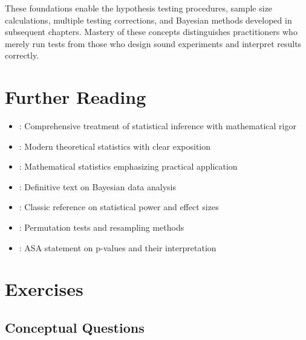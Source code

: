 These foundations enable the hypothesis testing procedures, sample size calculations, multiple testing corrections, and Bayesian methods developed in subsequent chapters. Mastery of these concepts distinguishes practitioners who merely run tests from those who design sound experiments and interpret results correctly.

\section{Further Reading}

\begin{itemize}
    \item \citet{casella2002statistical}: Comprehensive treatment of statistical inference with mathematical rigor
    \item \citet{wasserman2004all}: Modern theoretical statistics with clear exposition
    \item \citet{rice2006mathematical}: Mathematical statistics emphasizing practical application
    \item \citet{gelman2013bayesian}: Definitive text on Bayesian data analysis
    \item \citet{cohen1988statistical}: Classic reference on statistical power and effect sizes
    \item \citet{good2013permutation}: Permutation tests and resampling methods
    \item \citet{wasserstein2016asa}: ASA statement on p-values and their interpretation
\end{itemize}

\section{Exercises}

\subsection{Conceptual Questions}

